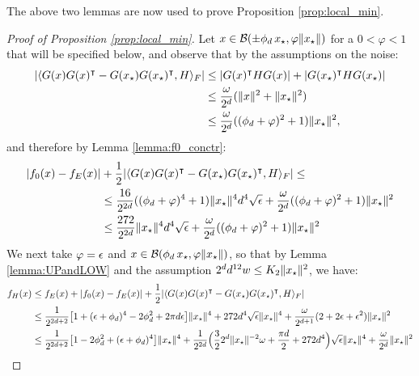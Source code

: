 The above two lemmas are now used to prove Proposition \ref{prop:local_min}.
\begin{proof}[Proof of Proposition \ref{prop:local_min}]
	Let $x \in \mathcal{B}(\pm \phi_d \,{x_{\star}}, \varphi \|{x_{\star}}\|)$ for a $0 < \varphi < 1$ that will be specified below, and observe that by the assumptions on the noise:
	\[
	\begin{aligned}
	|\langle G(x) G(x)^\intercal - G({x_{\star}})G({x_{\star}})^\intercal, H \rangle_F| &\leq |G(x)^\intercal H G(x)| + |G({x_{\star}})^\intercal H G({x_{\star}})| \\
	&\leq \frac{\omega}{2^d} (\|x\|^2 + \|{x_{\star}}\|^2) \\
	&\leq \frac{\omega}{2^d} ((\phi_d + \varphi)^2 + 1) \| {x_{\star}} \|^2,
	\end{aligned}
	\] 
	and therefore by Lemma \ref{lemma:f0_conctr}:
	\[
	\begin{aligned}
	|f_0(x) - f_E(x)| &+  \frac{1}{2}|\langle G(x) G(x)^\intercal - G({x_{\star}})G({x_{\star}})^\intercal, H \rangle_F| \leq \\
	&\leq \frac{16}{2^{2d}} ((\phi_d + \varphi)^4 + 1) \|{x_{\star}}\|^4 d^4 \sqrt{\epsilon} + \frac{\omega}{2^d} ((\phi_d + \varphi)^2 + 1) \| {x_{\star}} \|^2 \\
	&\leq \frac{272}{2^{2d}}\|{x_{\star}}\|^4 d^4 \sqrt{\epsilon} + \frac{\omega}{2^d} ((\phi_d + \varphi)^2 + 1) \| {x_{\star}} \|^2
	\end{aligned}
	\]  
	We next take $\varphi = \epsilon$ and $x \in \mathcal{B}(\phi_d \,{x_{\star}}, \varphi \|{x_{\star}}\|)$, so that by Lemma \ref{lemma:UPandLOW} and the assumption $2^d d^{12} w \leq K_2 \| {x_{\star}} \|^2$, we have:
	\[
	\begin{aligned}
	f_H(x) &\leq f_E(x) + |f_0(x) - f_E(x)| + \frac{1}{2}  |\langle G(x) G(x)^\T - G(\xstar)G(\xstar)^\T, H \rangle_F | \\
	&\leq \frac{1}{2^{2d+2}} \big[ 1 + (\eps + \phi_d)^4 - 2 \phi_d^2 + 2 \pi d \eps  \big] \|\xstar \|^4 
	+ 272 d^4 \sqrt{\eps} \|\xstar\|^4
	+ \frac{\omega}{2^{d+1}} (2 + 2 \eps + \eps^2) \|\xstar\|^2 \\
	&\leq \frac{1}{2^{2d +2}} \big[ 1 - 2 \phi_d^2 + (\eps + \phi_d)^4 \big]  \|\xstar\|^4 
	+\frac{1}{2^{2d}}\Big(\frac{3}{2} 2^d \|\xstar\|^{-2} \omega +  \frac{\pi d}{2} + 272 d^4 \Big)\sqrt{\eps} \|\xstar\|^4  + \frac{\omega }{2^{d}}\|\xstar\|^2\\

\end{aligned}\]
\end{proof}
